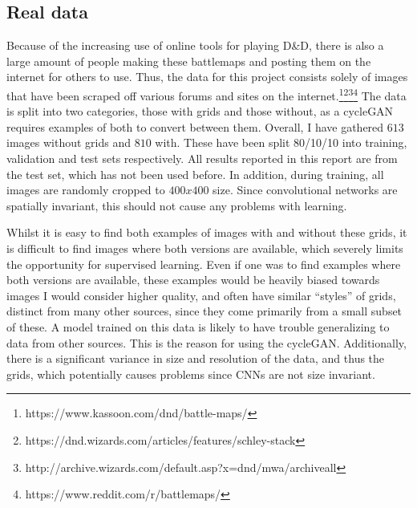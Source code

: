 \subsection{Real data}
Because of the increasing use of online tools for playing D\&D, there is also a large amount of people making these battlemaps and posting them on the internet for others to use. Thus, the data for this project consists solely of images that have been scraped off various forums and sites on the internet.\footnote{https://www.kassoon.com/dnd/battle-maps/}\footnote{https://dnd.wizards.com/articles/features/schley-stack}\footnote{http://archive.wizards.com/default.asp?x=dnd/mwa/archiveall}\footnote{https://www.reddit.com/r/battlemaps/} The data is split into two categories, those with grids and those without, as a cycleGAN requires examples of both to convert between them. Overall, I have gathered $613$ images without grids and $810$ with. These have been split 80/10/10 into training, validation and test sets respectively. All results reported in this report are from the test set, which has not been used before. In addition, during training, all images are randomly cropped to $400x400$ size. Since convolutional networks are spatially invariant, this should not cause any problems with learning.

Whilst it is easy to find both examples of images with and without these grids, it is difficult to find images where both versions are available, which severely limits the opportunity for supervised learning. Even if one was to find examples where both versions are available, these examples would be heavily biased towards images I would consider higher quality, and often have similar ``styles'' of grids, distinct from many other sources, since they come primarily from a small subset of these. A model trained on this data is likely to have trouble generalizing to data from other sources. This is the reason for using the cycleGAN. Additionally, there is a significant variance in size and resolution of the data, and thus the grids, which potentially causes problems since CNNs are not size invariant.

